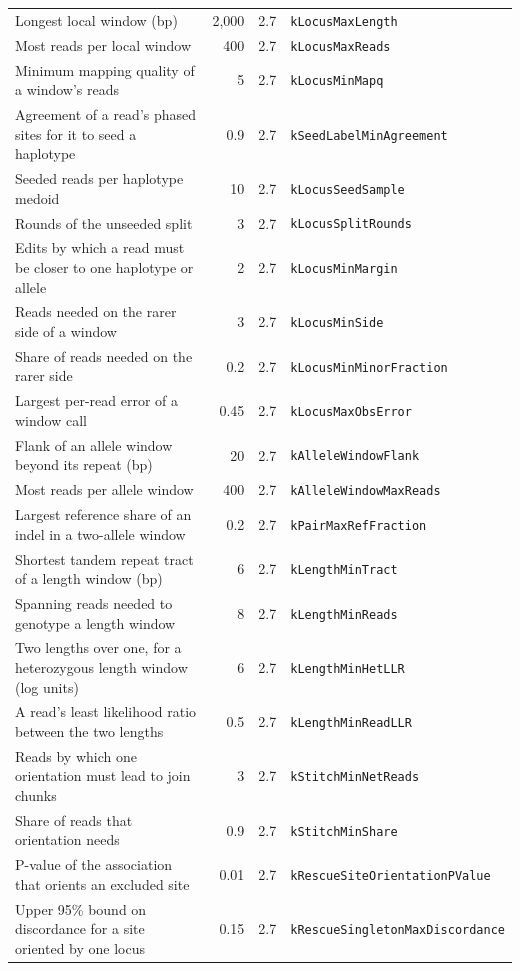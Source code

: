 \documentclass[10pt]{article}
\begin{document}
{\begin{longtable}{@{}>{\raggedright\arraybackslash}p{5.0cm}rrl@{}}
Longest local window (bp) & 2{,}000 & 2.7 & \texttt{kLocusMaxLength} \\
Most reads per local window & 400 & 2.7 & \texttt{kLocusMaxReads} \\
Minimum mapping quality of a window's reads & 5 & 2.7 & \texttt{kLocusMinMapq} \\
Agreement of a read's phased sites for it to seed a haplotype & 0.9 & 2.7 & \texttt{kSeedLabelMinAgreement} \\
Seeded reads per haplotype medoid & 10 & 2.7 & \texttt{kLocusSeedSample} \\
Rounds of the unseeded split & 3 & 2.7 & \texttt{kLocusSplitRounds} \\
Edits by which a read must be closer to one haplotype or allele & 2 & 2.7 & \texttt{kLocusMinMargin} \\
Reads needed on the rarer side of a window & 3 & 2.7 & \texttt{kLocusMinSide} \\
Share of reads needed on the rarer side & 0.2 & 2.7 & \texttt{kLocusMinMinorFraction} \\
Largest per-read error of a window call & 0.45 & 2.7 & \texttt{kLocusMaxObsError} \\
Flank of an allele window beyond its repeat (bp) & 20 & 2.7 & \texttt{kAlleleWindowFlank} \\
Most reads per allele window & 400 & 2.7 & \texttt{kAlleleWindowMaxReads} \\
Largest reference share of an indel in a two-allele window & 0.2 & 2.7 & \texttt{kPairMaxRefFraction} \\
Shortest tandem repeat tract of a length window (bp) & 6 & 2.7 & \texttt{kLengthMinTract} \\
Spanning reads needed to genotype a length window & 8 & 2.7 & \texttt{kLengthMinReads} \\
Two lengths over one, for a heterozygous length window (log units) & 6 & 2.7 & \texttt{kLengthMinHetLLR} \\
A read's least likelihood ratio between the two lengths & 0.5 & 2.7 & \texttt{kLengthMinReadLLR} \\
Reads by which one orientation must lead to join chunks & 3 & 2.7 & \texttt{kStitchMinNetReads} \\
Share of reads that orientation needs & 0.9 & 2.7 & \texttt{kStitchMinShare} \\
P-value of the association that orients an excluded site & 0.01 & 2.7 & \texttt{kRescueSiteOrientationPValue} \\
Upper 95\% bound on discordance for a site oriented by one locus & 0.15 & 2.7 & \texttt{kRescueSingletonMaxDiscordance} \\

\end{longtable}}
\end{document}
